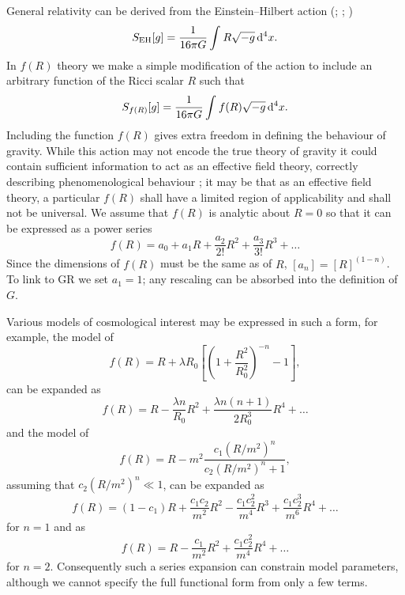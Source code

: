 General relativity can be derived from the Einstein--Hilbert action (\citealt[chapter 21]{Misner1973}; \citealt[section 93]{Landau1975}; \citealt[section 26]{Dirac1996})
\begin{equation}
S_\mathrm{EH}[g] = \frac{1}{16\pi G}\int_{}^{}{R\sqrt{-g}}\,\mathrm{d}{^4x}.
\end{equation}
In $f(R)$ theory we make a simple modification of the action to include an arbitrary function of the Ricci scalar $R$ such that \citep{Buchdahl1970}
\begin{equation}
S_{f(R)}[g] = \frac{1}{16\pi G}\int_{}^{}{f(R)\sqrt{-g}}\,\mathrm{d}{^4x}.
\end{equation}
Including the function $f(R)$ gives extra freedom in defining the behaviour of gravity. While this action may not encode the true theory of gravity it could contain sufficient information to act as an effective field theory, correctly describing phenomenological behaviour \citep{Park2010}; it may be that as an effective field theory, a particular $f(R)$ shall have a limited region of applicability and shall not be universal. We assume that $f(R)$ is analytic about $R = 0$ so that it can be expressed as a power series \citep{Buchdahl1970, Clifton2008, Psaltis2008} %
\begin{equation}
f(R) = a_0 + a_1 R + \frac{a_2}{2!}R^2 + \frac{a_3}{3!}R^3 + \ldots
\end{equation}
Since the dimensions of $f(R)$ must be the same as of $R$, $[a_n] = [R]^{(1-n)}$. To link to GR we set $a_1 = 1$; any rescaling can be absorbed into the definition of $G$.

Various models of cosmological interest may be expressed in such a form, for example, the model of \citet{Starobinsky2007}
\begin{equation}
f(R) = R + \lambda R_0 \left[\left(1 + \frac{R^2}{R_0^2}\right)^{-n} - 1\right],
\end{equation}
can be expanded as
\begin{equation}
f(R) = R - \frac{\lambda n}{R_0} R^2 + \frac{\lambda n (n + 1)}{2 R_0^3} R^4 + \ldots
\end{equation}
and the model of \citet{Hu2007}
\begin{equation}
f(R) = R - m^2\frac{c_1\left(R/m^2\right)^n}{c_2\left(R/m^2\right)^n + 1},
\end{equation}
assuming that $c_2(R/m^2)^n \ll 1$, can be expanded as
\begin{equation}
f(R) = (1 - c_1)R + \frac{c_1 c_2}{m^2}R^2 - \frac{c_1 c_2^2}{m^4}R^3 + \frac{c_1 c_2^3}{m^6}R^4 + \ldots 
\end{equation}
for $n = 1$ and as
\begin{equation}
f(R) = R - \frac{c_1}{m^2}R^2 + \frac{c_1 c_2^2}{m^4}R^4 + \ldots
\end{equation}
for $n = 2$. Consequently such a series expansion can constrain model parameters, although we cannot specify the full functional form from only a few terms.


